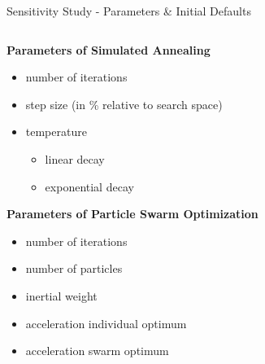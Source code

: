 \documentclass[11pt,aspectratio=169]{beamer}
\begin{document}
\begin{frame}[fragile]{Sensitivity Study - Parameters \& Initial Defaults}

    \begin{columns}
    \begin{column}{0.5\textwidth}
        \textbf{Parameters of Simulated Annealing}
        \begin{itemize}
            \item number of iterations
            \item step size (in \% relative to search space)
            \item temperature
                \begin{itemize}
                    \item linear decay
                    \item exponential decay
                \end{itemize}
        \end{itemize}

        \medskip %

        \textbf{Parameters of Particle Swarm Optimization}
        \begin{itemize}
            \item number of iterations
            \item number of particles
            \item inertial weight
            \item acceleration individual optimum
            \item acceleration swarm optimum
        \end{itemize}
    \end{column}


\end{columns}
\end{frame}
\end{document}
